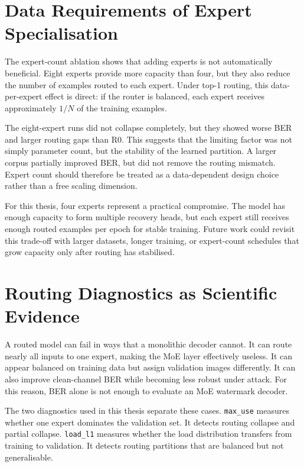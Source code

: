 ﻿\documentclass[12pt, a4paper, twoside]{report}
\numberwithin{equation}{chapter}
\begin{document}
\section{Data Requirements of Expert Specialisation}

The expert-count ablation shows that adding experts is not automatically beneficial. Eight experts provide more capacity than four, but they also reduce the number of examples routed to each expert. Under top-1 routing, this data-per-expert effect is direct: if the router is balanced, each expert receives approximately $1/N$ of the training examples.

The eight-expert runs did not collapse completely, but they showed worse BER and larger routing gaps than R0. This suggests that the limiting factor was not simply parameter count, but the stability of the learned partition. A larger corpus partially improved BER, but did not remove the routing mismatch. Expert count should therefore be treated as a data-dependent design choice rather than a free scaling dimension.

For this thesis, four experts represent a practical compromise. The model has enough capacity to form multiple recovery heads, but each expert still receives enough routed examples per epoch for stable training. Future work could revisit this trade-off with larger datasets, longer training, or expert-count schedules that grow capacity only after routing has stabilised.

\section{Routing Diagnostics as Scientific Evidence}

A routed model can fail in ways that a monolithic decoder cannot. It can route nearly all inputs to one expert, making the MoE layer effectively useless. It can appear balanced on training data but assign validation images differently. It can also improve clean-channel BER while becoming less robust under attack. For this reason, BER alone is not enough to evaluate an MoE watermark decoder.

The two diagnostics used in this thesis separate these cases. \texttt{max\_use} measures whether one expert dominates the validation set. It detects routing collapse and partial collapse. \texttt{load\_l1} measures whether the load distribution transfers from training to validation. It detects routing partitions that are balanced but not generalisable.
\end{document}
